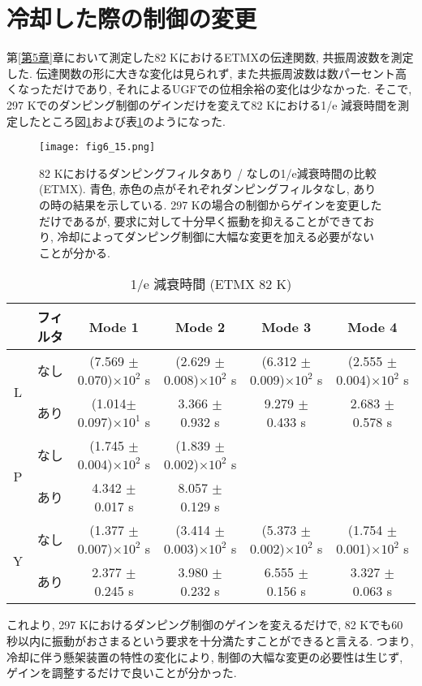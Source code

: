 \section{冷却した際の制御の変更}
第\ref{第5章}章において測定した82 KにおけるETMXの伝達関数, 共振周波数を測定した. 伝達関数の形に大きな変化は見られず, また共振周波数は数パーセント高くなっただけであり, それによるUGFでの位相余裕の変化は少なかった. そこで, 297 Kでのダンピング制御のゲインだけを変えて82 Kにおける1/e 減衰時間を測定したところ図\ref{fig6.15}および表\ref{table6.9}のようになった. 
\begin{figure}[H]
\begin{center}
\texttt{[image: fig6\_15.png]}
\caption[82 Kにおける1/e減衰時間 (ETMX)]{82 Kにおけるダンピングフィルタあり / なしの1/e減衰時間の比較 (ETMX). 青色, 赤色の点がそれぞれダンピングフィルタなし, ありの時の結果を示している. 297 Kの場合の制御からゲインを変更しただけであるが, 要求に対して十分早く振動を抑えることができており, 冷却によってダンピング制御に大幅な変更を加える必要がないことが分かる. }
\label{fig6.15}
\end{center}
\end{figure}
\begin{table}[H]
 \centering
  \begin{tabular}{|c||c|c|c|c|c|}
   \hline
    & フィルタ & Mode 1 & Mode 2 & Mode 3 & Mode 4 \\
   \hline
   \multirow{2}{*}{L} & なし &(7.569 $\pm$ 0.070)$\times10^2$ s & (2.629 $\pm$ 0.008)$\times10^2$ s & (6.312 $\pm$ 0.009)$\times10^2$ s & (2.555 $\pm$ 0.004)$\times10^2$ s \\
   \cline{2-6}
      & あり &(1.014$\pm$0.097)$\times10^1$ s & 3.366 $\pm$ 0.932 s & 9.279 $\pm$ 0.433 s & 2.683 $\pm$ 0.578 s \\
   \hline\hline
   \multirow{2}{*}{P} & なし &(1.745 $\pm$ 0.004)$\times10^2$ s & (1.839 $\pm$ 0.002)$\times10^2$ s & &  \\
   \cline{2-6}
     & あり & 4.342 $\pm$ 0.017 s & 8.057 $\pm$ 0.129 s & &  \\
   \hline\hline
   \multirow{2}{*}{Y} & なし &(1.377 $\pm$ 0.007)$\times10^2$ s & (3.414 $\pm$ 0.003)$\times10^2$ s & (5.373 $\pm$ 0.002)$\times10^2$ s & (1.754 $\pm$ 0.001)$\times10^2$ s \\
   \cline{2-6}
      & あり &2.377 $\pm$ 0.245 s & 3.980 $\pm$ 0.232 s & 6.555 $\pm$ 0.156 s & 3.327 $\pm$ 0.063 s \\
   \hline
  \end{tabular}
  \caption[1/e 減衰時間 (ETMX 82 K)]{1/e 減衰時間 (ETMX 82 K)}
   \label{table6.9}
\end{table}
これより, 297 Kにおけるダンピング制御のゲインを変えるだけで, 82 Kでも60 秒以内に振動がおさまるという要求を十分満たすことができると言える. つまり, 冷却に伴う懸架装置の特性の変化により, 制御の大幅な変更の必要性は生じず, ゲインを調整するだけで良いことが分かった.